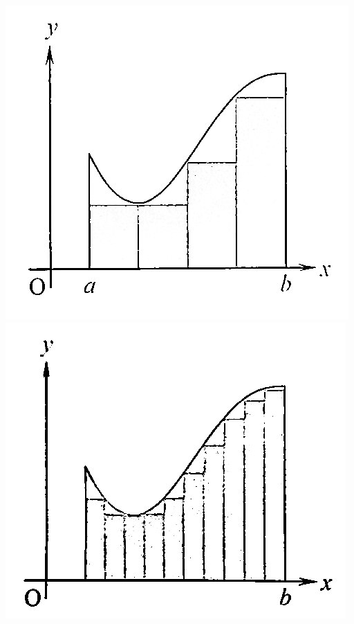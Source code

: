\begin{center}
    \includegraphics[scale=0.3]{assets/28-1.jpg}
    \includegraphics[scale=0.3]{assets/28-2.jpg}

\end{center}
